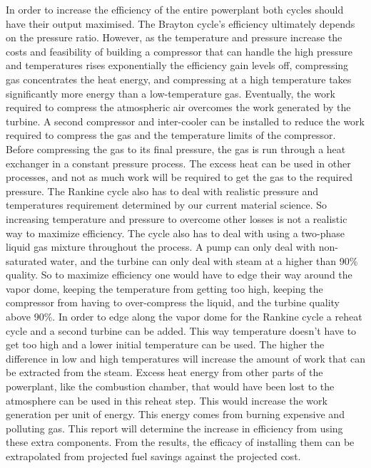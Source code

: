 \documentclass{article}
\begin{document}
\FloatBarrier
In order to increase the efficiency of the entire powerplant both cycles should have their output maximised. The Brayton cycle's efficiency ultimately depends on the pressure ratio. However, as the temperature and pressure increase the costs and feasibility of building a compressor that can handle the high pressure and temperatures rises exponentially the efficiency gain levels off, compressing gas concentrates the heat energy, and compressing at a high temperature takes significantly more energy than a low-temperature gas. Eventually, the work required to compress the atmospheric air overcomes the work generated by the turbine.
A second compressor and inter-cooler can be installed to reduce the work required to compress the gas and the temperature limits of the compressor. Before compressing the gas to its final pressure, the gas is run through a heat exchanger in a constant pressure process. The excess heat can be used in other processes, and not as much work will be required to get the gas to the required pressure.
The Rankine cycle also has to deal with realistic pressure and temperatures requirement determined by our current material science. So increasing temperature and pressure to overcome other losses is not a realistic way to maximize efficiency. The cycle also has to deal with using a two-phase liquid gas mixture throughout the process. A pump can only deal with non-saturated water, and the turbine can only deal with steam at a higher than 90\% quality. So to maximize efficiency one would have to edge their way around the vapor dome, keeping the temperature from getting too high, keeping the compressor from having to over-compress the liquid, and the turbine quality above 90\%.
In order to edge along the vapor dome for the Rankine cycle a reheat cycle and a second turbine can be added. This way temperature doesn't have to get too high and a lower initial temperature can be used. The higher the difference in low and high temperatures will increase the amount of work that can be extracted from the steam. Excess heat energy from other parts of the powerplant, like the combustion chamber, that would have been lost to the atmosphere can be used in this reheat step. This would increase the work generation per unit of energy. This energy comes from burning expensive and polluting gas. 
This report will determine the increase in efficiency from using these extra components. From the results, the efficacy of installing them can be extrapolated from projected fuel savings against the projected cost.
\end{document}
